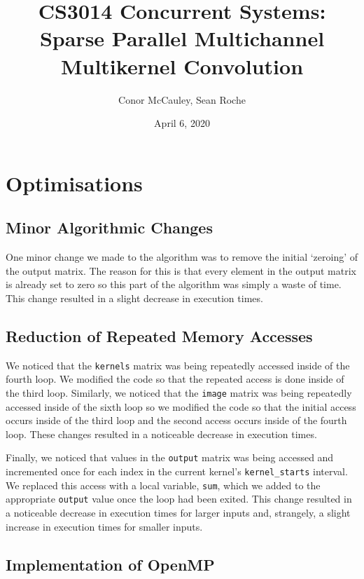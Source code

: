 \documentclass[12pt]{article}
\title{CS3014 Concurrent Systems: Sparse Parallel Multichannel Multikernel Convolution}
\author{Conor McCauley, Sean Roche}
\date{April 6, 2020}
\begin{document}
\maketitle

\section{Optimisations}

\subsection{Minor Algorithmic Changes}

\noindent One minor change we made to the algorithm was to remove the initial `zeroing' of the output matrix. The reason for this is that every element in the output matrix is already set to zero so this part of the algorithm was simply a waste of time. This change resulted in a slight decrease in execution times.

\subsection{Reduction of Repeated Memory Accesses}

\noindent We noticed that the \texttt{kernels} matrix was being repeatedly accessed inside of the fourth loop. We modified the code so that the repeated access is done inside of the third loop. Similarly, we noticed that the \texttt{image} matrix was being repeatedly accessed inside of the sixth loop so we modified the code so that the initial access occurs inside of the third loop and the second access occurs inside of the fourth loop. These changes resulted in a noticeable decrease in execution times.

\indent Finally, we noticed that values in the \texttt{output} matrix was being accessed and incremented once for each index in the current kernel's \texttt{kernel\_starts} interval. We replaced this access with a local variable, \texttt{sum}, which we added to the appropriate \texttt{output} value once the loop had been exited. This change resulted in a noticeable decrease in execution times for larger inputs and, strangely, a slight increase in execution times for smaller inputs.

\subsection{Implementation of OpenMP}
\end{document}
